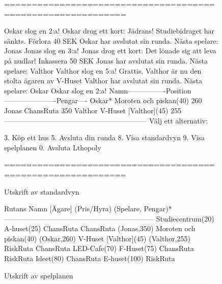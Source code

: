 \begin{figure}[H]
\centering

\begin{REPL}
============================================================

Oskar slog en 2:a!
Oskar drog ett kort: Jädrans! Studiebidraget har sänkts. Förlora 40 SEK
Oskar har avslutat sin runda.
Nästa spelare: Jonas
Jonas slog en 3:a!
Jonas drog ett kort: Det lönade sig att leva på nudlar! Inkassera 50 SEK
Jonas har avslutat sin runda.
Nästa spelare: Valthor
Valthor slog en 5:a!
Grattis, Valthor är nu den stolta ägaren av V-Huset
Valthor har avslutat sin runda.
Nästa spelare: Oskar
Oskar slog en 2:a!
Namn----------------Position----------------------Pengar----
Oskar*              Moroten och piskan(40)        260       
Jonas               ChansRuta                     350       
Valthor             V-Huset [Valthor](45)         255       
------------------------------------------------------------
Välj ett alternativ:

	3. Köp ett hus                   
	5. Avsluta din runda             
	8. Visa standardvyn              
	9. Visa spelplanen               
	0. Avsluta Lthopoly              

============================================================

\end{REPL}
\caption {Utskrift av standardvyn}
\label{fig:scalajava:lthopoly-team:defaultview}
\end{figure}

\begin{figure}[H]
\centering

\begin{REPL}
Rutans Namn [Ägare] (Pris/Hyra) (Spelare, Pengar)*
---------------------------------------------------------------
Studiecentrum(20)
A-huset(25) 
ChansRuta 
ChansRuta (Jonas,350)
Moroten och piskan(40) (Oskar,260)
V-Huset [Valthor](45) (Valthor,255)
RiskRuta 
ChansRuta 
LED-Cafe(70) 
F-Huset(75) 
ChansRuta 
RiskRuta 
Ideet(80) 
ChansRuta 
E-huset(100) 
RiskRuta 
\end{REPL}

\caption {Utskrift av spelplanen}
\label{fig:scalajava:lthopoly-team:boardview}
\end{figure}

